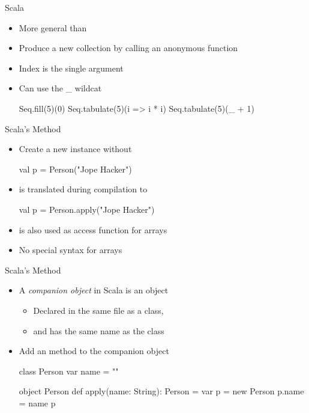 \begin{frame}[fragile]{Scala }
\begin{itemize}
\item More general than 
\item Produce a new collection by calling an anonymous function
\item Index is the single argument
\item Can use the \_ wildcat
\begin{chisel}
Seq.fill(5)(0)
Seq.tabulate(5)(i => i * i)
Seq.tabulate(5)(_ + 1)
\end{chisel}
\end{itemize}
\end{frame}


\begin{frame}[fragile]{Scala's  Method}
\begin{itemize}
\item Create a new instance without 
\begin{chisel}
val p = Person("Jope Hacker")
\end{chisel}
\item is translated during compilation to
\begin{chisel}
val p = Person.apply("Jope Hacker")
\end{chisel}
\item {} is also used as access function for arrays
\item No special syntax for arrays
\end{itemize}
\end{frame}

\begin{frame}[fragile]{Scala's  Method}
\begin{itemize}
\item A \emph{companion object} in Scala is an object
\begin{itemize}
\item Declared in the same file as a class,
\item and has the same name as the class
\end{itemize}
\item Add an  method to the companion object
\begin{chisel}
class Person {
    var name = ""
}

object Person {
    def apply(name: String): Person = {
        var p = new Person
        p.name = name
        p
    }
}
\end{chisel}
\end{itemize}
\end{frame}

